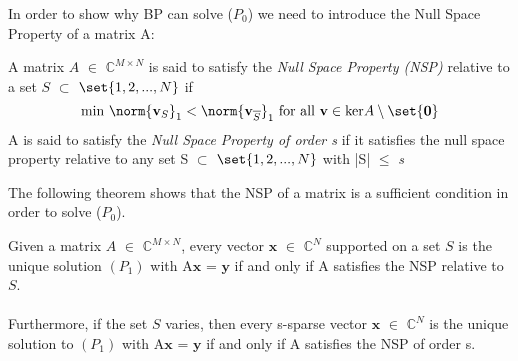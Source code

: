 In order to show why BP can solve ($P_{0}$)  we need to introduce the Null Space Property of a matrix A: 


\begin{definition} 
A matrix $A$  $\in$ $\mathbb{C}^{M \times N}$ is said to satisfy the \emph{Null Space Property (NSP)} relative to a set $S$ $\subset$ $\set{1,2,...,N}$ if 
\[
\text{min} \ \norm{ \mathbf{v}_{S}}_{1}  <  \norm{ \mathbf{v}_{\overline{S}}}_{1}  \ \text{for all} \ \mathbf{v} \in \text{ker} A \setminus \set{\mathbf{0}}
\]
A is said to satisfy the \emph{Null Space Property of order s} if it satisfies the null space property relative to any set S $\subset$ $\set{1,2,...,N}$ with |S| $\leq$ \emph{s}
\end{definition}

The following theorem shows that the NSP of a matrix is a sufficient condition in order to solve ($P_{0}$).

\begin{theorem}
Given a matrix $A$ $\in$ $\mathbb{C}^{M \times N}$, every vector  $\mathbf{x}$ $\in$ $\mathbb{C}^{N}$ supported on a set $S$ is the unique solution $(P_1)$ with A$\mathbf{x}$ = $\mathbf{y}$ if and only if A satisfies the NSP relative to $S$. \\ \\
Furthermore, if the set $S$ varies, then every s-sparse vector $\mathbf{x}$ $\in$ $\mathbb{C}^{N}$ is the unique solution to $(P_1)$ with A$\mathbf{x}$ = $\mathbf{y}$ if and only if A satisfies the NSP of order s.
\end{theorem}


